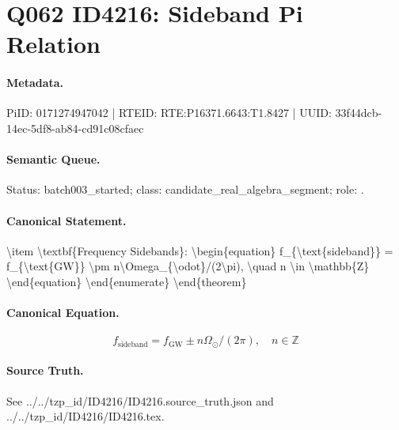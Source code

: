 \section*{Q062 ID4216: Sideband Pi Relation}
\paragraph{Metadata.}
PiID: 0171274947042 | RTEID: RTE:P16371.6643:T1.8427 | UUID: 33f44dcb-14ec-5df8-ab84-cd91c08cfaec

\paragraph{Semantic Queue.}
Status: batch003\_started; class: candidate\_real\_algebra\_segment; role: .

\paragraph{Canonical Statement.}
\textbackslash{}item \textbackslash{}textbf\{Frequency Sidebands\}: \textbackslash{}begin\{equation\} f\_\{\textbackslash{}text\{sideband\}\} = f\_\{\textbackslash{}text\{GW\}\} \textbackslash{}pm n\textbackslash{}Omega\_\{\textbackslash{}odot\}/(2\textbackslash{}pi), \textbackslash{}quad n \textbackslash{}in \textbackslash{}mathbb\{Z\} \textbackslash{}end\{equation\} \textbackslash{}end\{enumerate\} \textbackslash{}end\{theorem\}

\paragraph{Canonical Equation.}
\[
\begin{equation} f_{\text{sideband}} = f_{\text{GW}} \pm n\Omega_{\odot}/(2\pi), \quad n \in \mathbb{Z} \end{equation}
\]

\paragraph{Source Truth.}
See ../../tzp\_id/ID4216/ID4216.source\_truth.json and ../../tzp\_id/ID4216/ID4216.tex.
